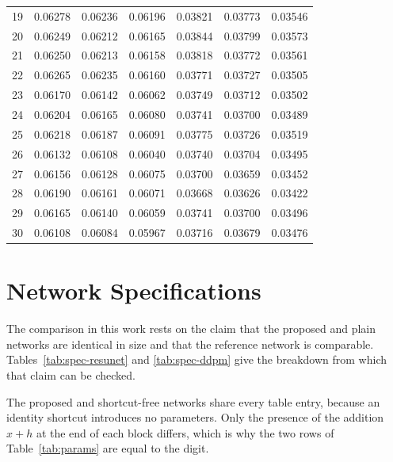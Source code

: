 \begin{table}[htbp]
\begin{tabular}{ccccccc}
        19 & 0.06278 & 0.06236 & 0.06196 & 0.03821 & 0.03773 & 0.03546 \\
        20 & 0.06249 & 0.06212 & 0.06165 & 0.03844 & 0.03799 & 0.03573 \\
        21 & 0.06250 & 0.06213 & 0.06158 & 0.03818 & 0.03772 & 0.03561 \\
        22 & 0.06265 & 0.06235 & 0.06160 & 0.03771 & 0.03727 & 0.03505 \\
        23 & 0.06170 & 0.06142 & 0.06062 & 0.03749 & 0.03712 & 0.03502 \\
        24 & 0.06204 & 0.06165 & 0.06080 & 0.03741 & 0.03700 & 0.03489 \\
        25 & 0.06218 & 0.06187 & 0.06091 & 0.03775 & 0.03726 & 0.03519 \\
        26 & 0.06132 & 0.06108 & 0.06040 & 0.03740 & 0.03704 & 0.03495 \\
        27 & 0.06156 & 0.06128 & 0.06075 & 0.03700 & 0.03659 & 0.03452 \\
        28 & 0.06190 & 0.06161 & 0.06071 & 0.03668 & 0.03626 & 0.03422 \\
        29 & 0.06165 & 0.06140 & 0.06059 & 0.03741 & 0.03700 & 0.03496 \\
        30 & 0.06108 & 0.06084 & 0.05967 & 0.03716 & 0.03679 & 0.03476 \\
        \bottomrule
    \end{tabular}
\end{table}

\section{Network Specifications}
\label{sec:specs}

The comparison in this work rests on the claim that the proposed and plain networks are identical in
size and that the reference network is comparable. Tables~\ref{tab:spec-resunet} and
\ref{tab:spec-ddpm} give the breakdown from which that claim can be checked.

The proposed and shortcut-free networks share every table entry, because an identity shortcut
introduces no parameters. Only the presence of the addition $x + h$ at the end of each block
differs, which is why the two rows of Table~\ref{tab:params} are equal to the digit.

